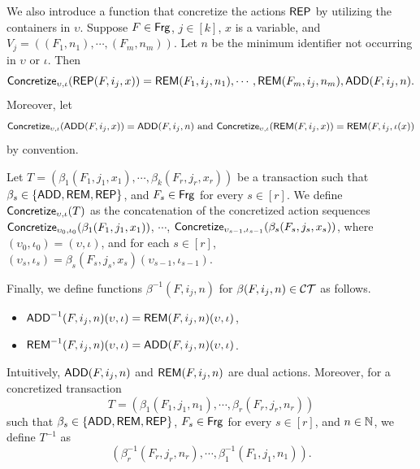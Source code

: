 We also introduce a function that concretize the actions $\mathsf{REP}$ by utilizing the containers in $\upsilon$. Suppose $F \in {\sf Frg}$, $j \in [k]$, $x$ is a variable, and $V_j = ((F_1, n_1), \cdots, (F_{m}, n_m))$. Let $n$ be the minimum identifier not occurring in $\upsilon$ or $\iota$.
Then
$$
\mathsf{Concretize}_{\upsilon, \iota}(\mathsf{REP}(F, i_j, x)) =
\mathsf{REM}(F_{1}, i_j, n_1), \cdots, \mathsf{REM}(F_{m}, i_j, n_m), \mathsf{ADD}(F, i_j, n).
$$
%
%
Moreover, let 
$$\mathsf{Concretize}_{\upsilon,\iota}(\mathsf{ADD}(F, i_j, x)) = \mathsf{ADD}(F, i_j, n) \mbox{ and } \mathsf{Concretize}_{\upsilon,\iota}(\mathsf{REM}(F, i_j, x)) = \mathsf{REM}(F, i_j, \iota(x))$$
by convention.
%
%

Let $T = (\beta_1(F_1, j_1, x_1), \cdots, \beta_k(F_r, j_r, x_r))$ be a transaction such that $\beta_s \in \{\mathsf{ADD},\mathsf{REM}, \mathsf{REP}\}$, and $F_s \in {\sf Frg}$ for every $s \in [r]$.
We define $\mathsf{Concretize}_{\upsilon, \iota}(T)$ as the concatenation of the concretized action sequences 
$ \mathsf{Concretize}_{\upsilon_0, \iota_0}(\beta_1(F_1, j_1, x_1))$, $\cdots$, $\mathsf{Concretize}_{\upsilon_{s-1}, \iota_{s-1}}(\beta_s(F_s, j_s, x_s))$,
where $(\upsilon_0, \iota_0)= (\upsilon, \iota)$, and for each $s \in [r]$, $(\upsilon_s, \iota_s) = \beta_s(F_s, j_s, x_s)(\upsilon_{s-1}, \iota_{s-1})$.

Finally, we define functions $\beta^{-1}(F, i_j, n)$ for $\beta(F, i_j, n) \in \mathcal{CT}$ as follows.
\begin{itemize}
 \item $\mathsf{ADD}^{-1}(F, i_j, n)(\upsilon, \iota) =\mathsf{REM}(F, i_j, n)(\upsilon, \iota)$,
 \item $\mathsf{REM}^{-1}(F, i_j, n)(\upsilon, \iota) = \mathsf{ADD}(F, i_j, n)(\upsilon, \iota)$.
\end{itemize}
Intuitively, $\mathsf{ADD}(F, i_j, n)$ and $\mathsf{REM}(F, i_j, n)$ are dual actions.
%
Moreover, for a concretized transaction 
$$T = (\beta_1(F_1, j_1, n_1), \cdots, \beta_{r}(F_r, j_r, n_r))$$ 
such that $\beta_s \in \{\mathsf{ADD},\mathsf{REM},\mathsf{REP}\}$, $F_s \in {\sf Frg}$ for every $s \in [r]$, and $n \in {\mathbb{N} }$, we define $T^{-1}$ as 
$$(\beta^{-1}_{r}(F_r, j_r, n_r), \cdots, \beta^{-1}_1(F_1, j_1, n_1)).$$




